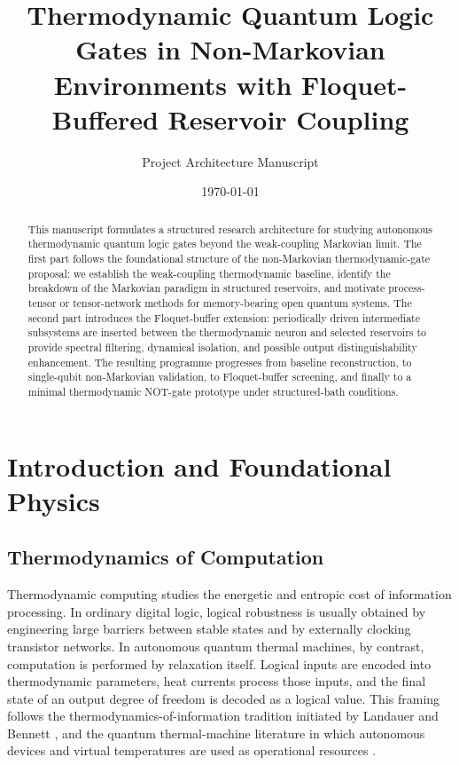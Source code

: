 \documentclass[11pt]{article}
\title{Thermodynamic Quantum Logic Gates in Non-Markovian Environments with Floquet-Buffered Reservoir Coupling}
\author{Project Architecture Manuscript}
\date{\today}
\begin{document}
\maketitle

\begin{abstract}
This manuscript formulates a structured research architecture for studying autonomous
thermodynamic quantum logic gates beyond the weak-coupling Markovian limit.  The first
part follows the foundational structure of the non-Markovian thermodynamic-gate proposal:
we establish the weak-coupling thermodynamic baseline, identify the breakdown of the
Markovian paradigm in structured reservoirs, and motivate process-tensor or tensor-network
methods for memory-bearing open quantum systems.  The second part introduces the
Floquet-buffer extension: periodically driven intermediate subsystems are inserted between
the thermodynamic neuron and selected reservoirs to provide spectral filtering, dynamical
isolation, and possible output distinguishability enhancement.  The resulting programme
progresses from baseline reconstruction, to single-qubit non-Markovian validation, to
Floquet-buffer screening, and finally to a minimal thermodynamic NOT-gate prototype under
structured-bath conditions.
\end{abstract}

\tableofcontents

\section{Introduction and Foundational Physics}

\subsection{Thermodynamics of Computation}

Thermodynamic computing studies the energetic and entropic cost of information processing.
In ordinary digital logic, logical robustness is usually obtained by engineering large barriers
between stable states and by externally clocking transistor networks.  In autonomous quantum
thermal machines, by contrast, computation is performed by relaxation itself.  Logical inputs
are encoded into thermodynamic parameters, heat currents process those inputs, and the final
state of an output degree of freedom is decoded as a logical value.
This framing follows the thermodynamics-of-information tradition initiated by Landauer and
Bennett \cite{landauer1961,bennett1982}, and the quantum thermal-machine literature in
which autonomous devices and virtual temperatures are used as operational resources
\cite{kosloff2013,skrzypczyk2011}.
\end{document}
